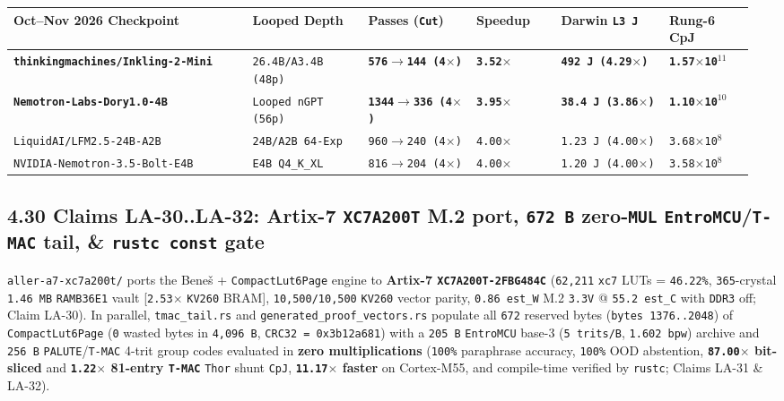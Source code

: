 \documentclass[10pt]{article}
\begin{document}
{\footnotesize\setlength{\tabcolsep}{2.2pt}
\begin{longtable}{@{}L{0.31\linewidth}C{0.15\linewidth}C{0.14\linewidth}C{0.11\linewidth}C{0.14\linewidth}C{0.11\linewidth}@{}}
\toprule
\textbf{Oct--Nov 2026 Checkpoint} & \textbf{Looped Depth} & \textbf{Passes (\texttt{Cut})} & \textbf{Speedup} & \textbf{Darwin \texttt{L3 J}} & \textbf{Rung-6 CpJ} \\
\midrule
\endhead
\textbf{\texttt{thinkingmachines/Inkling-2-Mini}} & \texttt{26.4B/A3.4B (48p)} & \textbf{\texttt{576$\to$144 (4$\times$)}} & \textbf{\texttt{3.52$\times$}} & \textbf{\texttt{492 J (4.29$\times$)}} & \textbf{\texttt{1.57$\times$10$^{11}$}} \\
\textbf{\texttt{Nemotron-Labs-Dory1.0-4B}} & \texttt{Looped nGPT (56p)} & \textbf{\texttt{1344$\to$336 (4$\times$)}} & \textbf{\texttt{3.95$\times$}} & \textbf{\texttt{38.4 J (3.86$\times$)}} & \textbf{\texttt{1.10$\times$10$^{10}$}} \\
\texttt{LiquidAI/LFM2.5-24B-A2B} & \texttt{24B/A2B 64-Exp} & \texttt{960$\to$240 (4$\times$)} & \texttt{4.00$\times$} & \texttt{1.23 J (4.00$\times$)} & \texttt{3.68$\times$10$^8$} \\
\texttt{NVIDIA-Nemotron-3.5-Bolt-E4B} & \texttt{E4B Q4\_K\_XL} & \texttt{816$\to$204 (4$\times$)} & \texttt{4.00$\times$} & \texttt{1.20 J (4.00$\times$)} & \texttt{3.58$\times$10$^8$} \\
\bottomrule
\end{longtable}
}

\subsection{4.30 Claims LA-30..LA-32: Artix-7 \texttt{XC7A200T} M.2 port, \texttt{672 B} zero-\texttt{MUL} \texttt{EntroMCU}/\texttt{T-MAC} tail, \& \texttt{rustc const} gate}\label{claim-la30}

\texttt{aller-a7-xc7a200t/} ports the Bene\v{s} + \texttt{CompactLut6Page} engine to \textbf{Artix-7 \texttt{XC7A200T-2FBG484C}} (\texttt{62,211} \texttt{xc7} LUTs = \texttt{46.22\%}, \texttt{365}-crystal \texttt{1.46 MB} \texttt{RAMB36E1} vault [\texttt{2.53$\times$} \texttt{KV260} BRAM], \texttt{10,500/10,500} \texttt{KV260} vector parity, \texttt{0.86 est\_W} M.2 \texttt{3.3V} @ \texttt{55.2 est\_C} with \texttt{DDR3} off; Claim LA-30). In parallel, \texttt{tmac\_tail.rs} and \texttt{generated\_proof\_vectors.rs} populate all \texttt{672} reserved bytes (\texttt{bytes 1376..2048}) of \texttt{CompactLut6Page} (\texttt{0} wasted bytes in \texttt{4,096 B}, \texttt{CRC32 = 0x3b12a681}) with a \texttt{205 B} \texttt{EntroMCU} base-3 (\texttt{5 trits/B}, \texttt{1.602 bpw}) archive and \texttt{256 B} \texttt{PALUTE}/\texttt{T-MAC} 4-trit group codes evaluated in \textbf{zero multiplications} (\texttt{100\%} paraphrase accuracy, \texttt{100\%} OOD abstention, \textbf{\texttt{87.00$\times$} bit-sliced} and \textbf{\texttt{1.22$\times$} 81-entry \texttt{T-MAC}} \texttt{Thor} shunt \texttt{CpJ}, \textbf{\texttt{11.17$\times$} faster} on Cortex-M55, and compile-time verified by \texttt{rustc}; Claims LA-31 \& LA-32).
\end{document}
